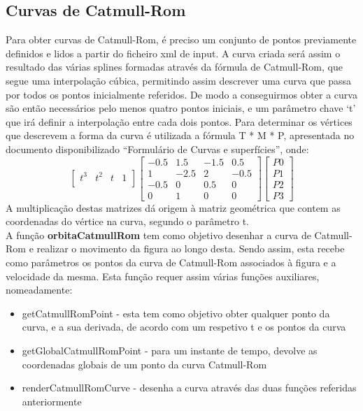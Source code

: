\documentclass[12pt]{article}
\begin{document}
\subsection{Curvas de Catmull-Rom}
Para obter curvas de Catmull-Rom, é preciso um conjunto de pontos previamente
definidos e lidos a partir do ficheiro xml de input. A curva criada será assim o resultado das várias splines
formadas através da fórmula de Catmull-Rom, que segue uma interpolação cúbica, permitindo
assim descrever uma curva que passa por todos os pontos inicialmente referidos.
De modo a conseguirmos obter a curva são então necessários pelo menos quatro pontos
iniciais, e um parâmetro chave ‘t’ que irá definir a interpolação entre cada dois pontos.
Para determinar os vértices que descrevem a forma da curva é utilizada a fórmula T * M * P,
apresentada no documento disponibilizado “Formulário de Curvas e superfícies”, onde:
\[
\begin{bmatrix}
    t^3 & t^2 & t & 1 \\
\end{bmatrix}
\begin{bmatrix}
    -0.5 & 1.5 & -1.5 & 0.5 \\
    1 & -2.5 & 2 & -0.5 \\
    -0.5 & 0 & 0.5 & 0 \\
    0 & 1 & 0 & 0 
\end{bmatrix}
\begin{bmatrix}
    P0 \\
    P1 \\
    P2 \\
    P3
\end{bmatrix}
\]
A multiplicação destas matrizes dá origem à matriz geométrica que contem as coordenadas
do vértice na curva, segundo o parâmetro t. \\
A função \textbf{orbitaCatmullRom} tem como objetivo desenhar a curva de
Catmull-Rom e realizar o movimento da figura ao longo desta. Sendo assim,
esta recebe como parâmetros os pontos da curva de Catmull-Rom
associados à figura e a velocidade da mesma. Esta função requer
assim várias funções auxiliares, nomeadamente:
\begin{itemize}
\item getCatmullRomPoint -  esta tem como
objetivo obter qualquer ponto da curva, e a sua derivada, de acordo com um
respetivo t e os pontos da curva
\item getGlobalCatmullRomPoint - para um instante de tempo, devolve as
coordenadas globais de um ponto da curva Catmull-Rom
\item renderCatmullRomCurve - desenha a curva
através das duas funções referidas anteriormente
\end{itemize}
\end{document}
